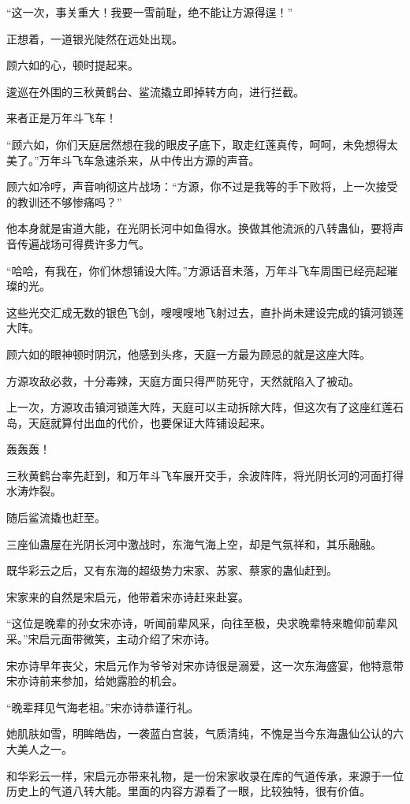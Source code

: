 \begin{this_body}
“这一次，事关重大！我要一雪前耻，绝不能让方源得逞！”

正想着，一道银光陡然在远处出现。

顾六如的心，顿时提起来。

逡巡在外围的三秋黄鹤台、鲨流撬立即掉转方向，进行拦截。

来者正是万年斗飞车！

“顾六如，你们天庭居然想在我的眼皮子底下，取走红莲真传，呵呵，未免想得太美了。”万年斗飞车急速杀来，从中传出方源的声音。

顾六如冷哼，声音响彻这片战场：“方源，你不过是我等的手下败将，上一次接受的教训还不够惨痛吗？”

他本身就是宙道大能，在光阴长河中如鱼得水。换做其他流派的八转蛊仙，要将声音传遍战场可得费许多力气。

“哈哈，有我在，你们休想铺设大阵。”方源话音未落，万年斗飞车周围已经亮起璀璨的光。

这些光交汇成无数的银色飞剑，嗖嗖嗖地飞射过去，直扑尚未建设完成的镇河锁莲大阵。

顾六如的眼神顿时阴沉，他感到头疼，天庭一方最为顾忌的就是这座大阵。

方源攻敌必救，十分毒辣，天庭方面只得严防死守，天然就陷入了被动。

上一次，方源攻击镇河锁莲大阵，天庭可以主动拆除大阵，但这次有了这座红莲石岛，天庭就算付出血的代价，也要保证大阵铺设起来。

轰轰轰！

三秋黄鹤台率先赶到，和万年斗飞车展开交手，余波阵阵，将光阴长河的河面打得水涛炸裂。

随后鲨流撬也赶至。

三座仙蛊屋在光阴长河中激战时，东海气海上空，却是气氛祥和，其乐融融。

既华彩云之后，又有东海的超级势力宋家、苏家、蔡家的蛊仙赶到。

宋家来的自然是宋启元，他带着宋亦诗赶来赴宴。

“这位是晚辈的孙女宋亦诗，听闻前辈风采，向往至极，央求晚辈特来瞻仰前辈风采。”宋启元面带微笑，主动介绍了宋亦诗。

宋亦诗早年丧父，宋启元作为爷爷对宋亦诗很是溺爱，这一次东海盛宴，他特意带宋亦诗前来参加，给她露脸的机会。

“晚辈拜见气海老祖。”宋亦诗恭谨行礼。

她肌肤如雪，明眸皓齿，一袭蓝白宫装，气质清纯，不愧是当今东海蛊仙公认的六大美人之一。

和华彩云一样，宋启元亦带来礼物，是一份宋家收录在库的气道传承，来源于一位历史上的气道八转大能。里面的内容方源看了一眼，比较独特，很有价值。


\end{this_body}
